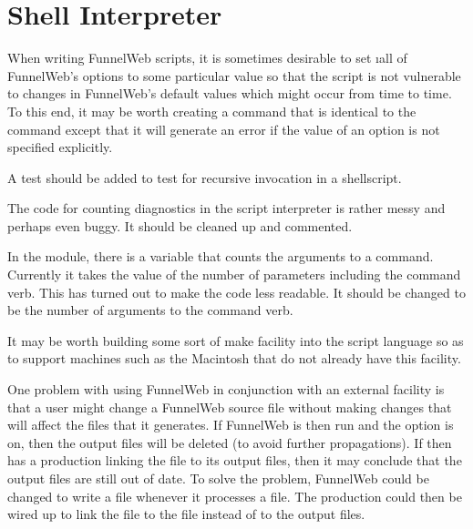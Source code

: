 \section{Shell Interpreter}

 When writing FunnelWeb scripts, it is sometimes
desirable to set \i{all} of FunnelWeb's options
to some particular value
so that the script is not vulnerable to changes in FunnelWeb's default
values which might occur from time to time. To this end, it may be worth
creating a  command that is identical to the  command
except that it will generate an error if the value of an option is not
specified explicitly.

 A test should be added to test for recursive
invocation in a shellscript.

 The code for counting diagnostics in the
script interpreter is rather messy and perhaps even buggy. It should be
cleaned up and commented.

 In the  module, there is a variable
that counts the arguments to a command. Currently it takes the value of
the number of parameters including the command verb. This has turned out
to make the code less readable. It should be changed to be the number of
arguments to the command verb.

 It may be worth building some sort of make facility
into the script language so as to support machines such as the Macintosh
that do not already have this facility.

 One problem with using FunnelWeb in conjunction with
an external  facility is that a user might change a FunnelWeb source
file without making changes that will affect the files that it generates.
If FunnelWeb is then run and the  option is on, then the output
files will be deleted (to avoid further  propagations).
If  then has a production linking the  file to its output
files, then it may conclude that the output files are still out of date.
To solve the problem, FunnelWeb could be changed to write a  file
whenever it processes a  file. The  production could then
be wired up to link
the  file to the  file instead of to the output
files.
  
